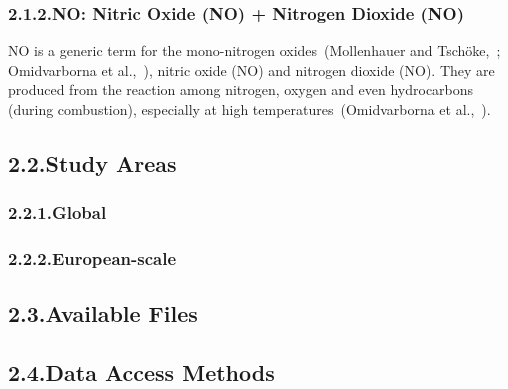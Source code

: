 \documentclass[9pt]{report}
\begin{document}
\subsubsection{2.1.2.\hspace*{0.5em}NO: Nitric Oxide (NO) + Nitrogen Dioxide (NO)}\label{sec-nox--nitric-oxide-no-nitrogen-dioxide-no2}%

\noindent{}NO is a generic term for the mono-nitrogen oxides~(Mollenhauer and Tschöke,~; Omidvarborna et al.,~), nitric oxide (NO) and nitrogen dioxide (NO).
They are produced from the reaction among nitrogen, oxygen and even hydrocarbons (during combustion), especially at high temperatures~(Omidvarborna et al.,~).%

\subsection{2.2.\hspace*{0.5em}Study Areas}\label{sec-study-areas}%

\subsubsection{2.2.1.\hspace*{0.5em}Global}\label{sec-global}%

\subsubsection{2.2.2.\hspace*{0.5em}European-scale}\label{sec-european-scale}%

\subsection{2.3.\hspace*{0.5em}Available Files}\label{sec-available-files}%

\subsection{2.4.\hspace*{0.5em}Data Access Methods}\label{sec-data-access-methods}%
\end{document}
